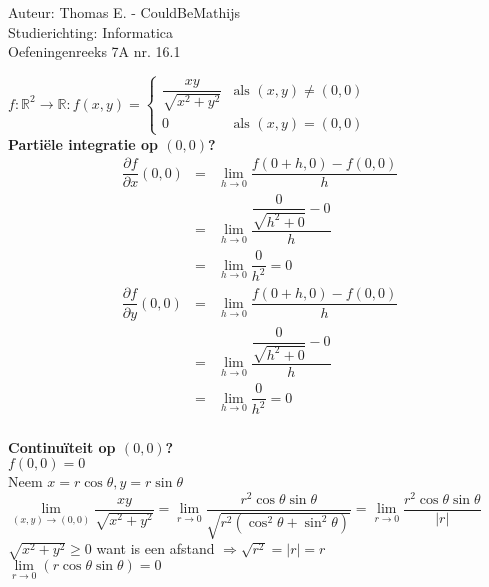 \documentclass[a4paper]{article}
\newcommand{\llim}{\lim\limits}
\newcommand{\pa}[1]{\dfrac{\partial f}{\partial #1}}
\begin{document}
  
\noindent \large Auteur: Thomas E. - CouldBeMathijs \\
\noindent \large Studierichting: Informatica\\
\noindent \large Oefeningenreeks 7A nr. 16.1\\

\medskip

\normalsize

$f: \mathbb{R}^2 \to \mathbb{R}:
f(x,y) = \left\{
\begin{array}{ll}
	\dfrac{xy}{\sqrt{x^2 + y^2}} & \text{als } (x,y) \neq (0,0) \\
	0 & \text{als } (x,y) = (0,0)
\end{array}
\right.$\\

\textbf{Partiële integratie op $(0,0)$?}\\

\begin{eqnarray*}
	\pa{x} (0,0) & = & \llim_{h \to 0} \dfrac{f(0+h,0)-f(0,0)}{h}\\
		& = & \llim_{h \to 0} \dfrac{\dfrac{0}{\sqrt{h^2+0}}-0}{h}\\
		& = & \llim_{h \to 0} \dfrac{0}{h^2} = 0\\
	\pa{y} (0,0) & = & \llim_{h \to 0} \dfrac{f(0+h,0)-f(0,0)}{h}\\
		& = & \llim_{h \to 0} \dfrac{\dfrac{0}{\sqrt{h^2+0}}-0}{h}\\
		& = & \llim_{h \to 0} \dfrac{0}{h^2} = 0\\
\end{eqnarray*}

\textbf{Continuïteit op $(0,0)$?}\\

$f(0,0) = 0$\\



Neem $ x = r \cos\theta, y = r \sin \theta$\\

$\llim_{(x,y) \to (0,0)} \dfrac{xy}{\sqrt{x^2+y^2}} = \llim_{r \to 0} \dfrac{r^2 \cos\theta\sin\theta}{\sqrt{r^2(\cos^2\theta+\sin^2\theta)}} = \llim_{r \to 0} \dfrac{r^2 \cos\theta \sin\theta}{|r|}$\\

$\sqrt{x^2+y^2} \ge 0$ want is een afstand $ \Rightarrow \sqrt{r^2} = |r| = r$\\

$\llim_{r \to 0} (r \cos\theta \sin\theta) = 0$\\
\end{document}
